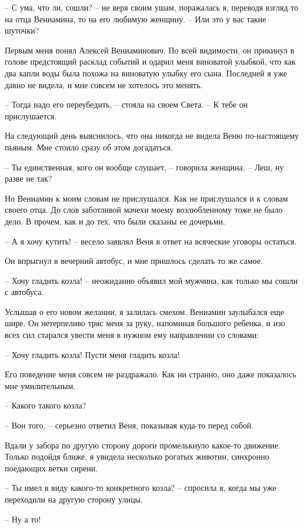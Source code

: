 \documentclass[
]{book}
\begin{document}
-- С ума, что ли, сошли? -- не веря своим ушам, поражалась я, переводя взгляд то на отца Вениамина, то на его любимую женщину. -- Или это у вас такие шуточки?

Первым меня понял Алексей Вениаминович. По всей видимости, он прикинул в голове предстоящий расклад событий и одарил меня виноватой улыбкой, что как два капли воды была похожа на виноватую улыбку его сына. Последней я уже давно не видела, и мне совсем не хотелось это менять.

-- Тогда надо его переубедить, -- стояла на своем Света. -- К тебе он прислушается.

На следующий день выяснилось, что она никогда не видела Веню по-настоящему пьяным. Мне стоило сразу об этом догадаться.

-- Ты единственная, кого он вообще слушает, -- говорила женщина. -- Леш, ну разве не так?

Но Вениамин к моим словам не прислушался. Как не прислушался и к словам своего отца. До слов заботливой мачехи моему возлюбленному тоже не было дело. В прочем, как и до тех, что были сказаны ее дочерьми.

-- А я хочу кутить! -- весело заявлял Веня в ответ на всяческие уговоры остаться.

Он впрыгнул в вечерний автобус, и мне пришлось сделать то же самое.

-- Хочу гладить козла! -- неожиданно объявил мой мужчина, как только мы сошли с автобуса.

Услышав о его новом желании, я залилась смехом. Вениамин заулыбался еще шире. Он нетерпеливо тряс меня за руку, напоминая большого ребенка, и изо всех сил старался увести меня в нужном ему направлении со словами:

-- Хочу гладить козла! Пусти меня гладить козла!

Его поведение меня совсем не раздражало. Как ни странно, оно даже показалось мне умилительным.

-- Какого такого козла?

-- Вон того, -- серьезно ответил Веня, показывая куда-то перед собой.

Вдали у забора по другую сторону дороги промелькнуло какое-то движение. Только подойдя ближе, я увидела несколько рогатых животин, синхронно поедающих ветки сирени.

-- Ты имел в виду какого-то конкретного козла? -- спросила я, когда мы уже переходили на другую сторону улицы.

-- Ну а то!
\end{document}

